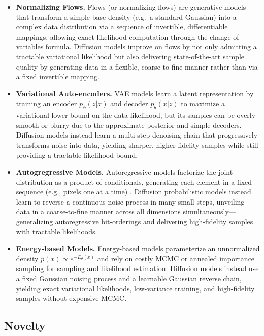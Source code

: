\documentclass[10pt]{article}
\begin{document}
\begin{itemize}
    \item \textbf{Normalizing Flows.} Flows (or normalizing flows) are generative models that transform a simple base density (e.g.\ a standard Gaussian) into a complex data distribution via a sequence of invertible, differentiable mappings, allowing exact likelihood computation through the change-of-variables formula. Diffusion models improve on flows by not only admitting a tractable variational likelihood but also delivering state-of-the-art sample quality by generating data in a flexible, coarse-to-fine manner rather than via a fixed invertible mapping.
    \item \textbf{Variational Auto-encoders.} VAE models learn a latent representation by training an encoder \(p_\phi(z|x)\) and decoder \(p_\theta(x|z)\) to maximize a variational lower bound on the data likelihood, but its samples can be overly smooth or blurry due to the approximate posterior and simple decoders. Diffusion models instead learn a multi-step denoising chain that progressively transforms noise into data, yielding sharper, higher-fidelity samples while still providing a tractable likelihood bound.
    \item \textbf{Autogregressive Models.} Autoregressive models factorize the joint distribution as a product of conditionals, generating each element in a fixed sequence (e.g., pixels one at a time) . Diffusion probabilistic models instead learn to reverse a continuous noise process in many small steps, unveiling data in a coarse-to-fine manner across all dimensions simultaneously—generalizing autoregressive bit-orderings and delivering high-fidelity samples with tractable likelihoods.
    \item \textbf{Energy-based Models.} Energy-based models parameterize an unnormalized density \(p(x) \propto e^{-E_\theta(x)}\) and rely on costly MCMC or annealed importance sampling for sampling and likelihood estimation. Diffusion models instead use a fixed Gaussian noising process and a learnable Gaussian reverse chain, yielding exact variational likelihoods, low-variance training, and high-fidelity samples without expensive MCMC.
\end{itemize}

\subsection*{Novelty}
\end{document}
